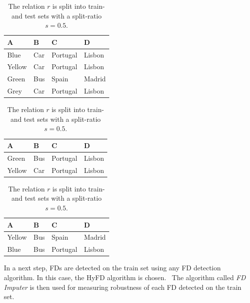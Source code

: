 \begin{table}[ht]
    \begin{subtable}[c]{0.9\textwidth}
        \centering
        \begin{tabular}{llll}
            \textsc{A} & \textsc{B} & \textsc{C} & \textsc{D} \\
        \toprule
        Blue & Car & Portugal & Lisbon \\
        Yellow & Car & Portugal & Lisbon  \\
        Green & Bus & Spain & Madrid  \\
        Grey & Car & Portugal & Lisbon  \\
        \bottomrule
        \end{tabular}
    \end{subtable}
    \begin{subtable}[c]{0.45\textwidth}
        \centering
        \begin{tabular}{llll}
            \textsc{A} & \textsc{B} & \textsc{C} & \textsc{D}  \\
        \toprule
            Green & Bus & Portugal & Lisbon \\
            Yellow & Car & Portugal & Lisbon \\
        \bottomrule
        \end{tabular}
    \end{subtable}
    \begin{subtable}[c]{0.45\textwidth}
        \centering
        \begin{tabular}{llll}
        \textsc{A} & \textsc{B} & \textsc{C} & \textsc{D} \\
        \toprule
        Yellow & Bus & Spain & Madrid \\
        Blue & Bus & Portugal & Lisbon \\
        \bottomrule
        \end{tabular}
    \end{subtable}
    \caption{The relation \( r \) is split into train- and test sets with a split-ratio \( s = 0.5 \). }
    \label{tab:split-example-fd-imputer}
\end{table}

In a next step, FDs are detected on the train set using any FD detection algorithm. In this case, the HyFD algorithm is chosen.~\cite{PAP16}
The algorithm called \emph{FD Imputer} is then used for measuring robustness of each FD detected on the train set.

